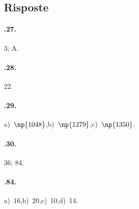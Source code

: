 \subsection{Risposte}

\paragraph{\thechapter.27.} 3; A.

\paragraph{\thechapter.28.} 22.

\paragraph{\thechapter.29.} a)~$\np{1048}$,\quad b)~$\np{1279}$,\quad c)~$\np{1350}$.

\paragraph{\thechapter.30.} 36; 84.

\paragraph{\thechapter.84.} a)~16,\quad b)~20,\quad c)~10,\quad d)~14.

